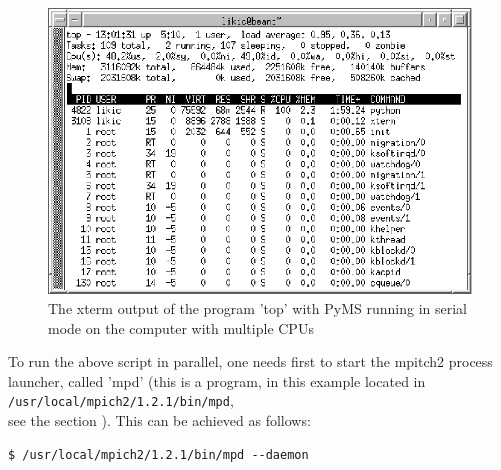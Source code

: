 \begin{figure}
  \begin{center}
    \includegraphics[scale=1.0]{graphics/chapter09/top-serial.eps}
  \end{center}
  \caption{The xterm output of the program 'top' with PyMS running in
  serial mode on the computer with multiple CPUs}
  \label{fig:top-serial}
\end{figure}

To run the above script in parallel, one needs first to start the
mpitch2 process launcher, called 'mpd' (this is a program, in this
example located in\\
 {\tt /usr/local/mpich2/1.2.1/bin/mpd},\\
see the section \label{sec:mpitch2}). This can be achieved as follows:

\begin{verbatim}
$ /usr/local/mpich2/1.2.1/bin/mpd --daemon
\end{verbatim}

